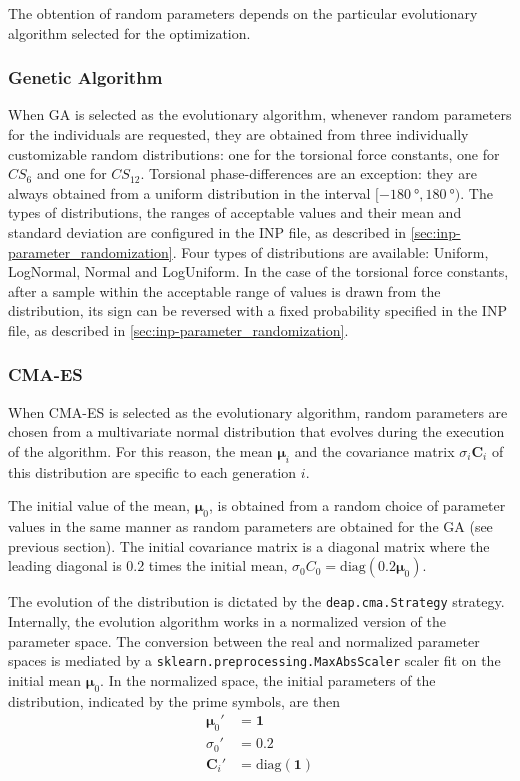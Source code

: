 \documentclass[10pt,a4paper,openany]{memoir}
\numberwithin{equation}{section}
\begin{document}
The obtention of random parameters depends on the particular
evolutionary algorithm selected for the optimization.

\subsubsection{Genetic Algorithm}

When GA is selected as the evolutionary algorithm, whenever random
parameters for the individuals are requested, they are obtained from
three individually customizable random distributions: one for the
torsional force constants, one for $CS_6$ and one for $CS_{12}$.
Torsional phase-differences are an exception: they are always obtained
from a uniform distribution in the interval $[\SI{-180}{\degree},
\SI{180}{\degree})$.  The types of distributions, the ranges of
acceptable values and their mean and standard deviation are configured
in the INP file, as described in
\autoref{sec:inp-parameter_randomization}.  Four types of
distributions are available: Uniform, LogNormal, Normal and
LogUniform. In the case of the torsional force constants, after a
sample within the acceptable range of values is drawn from the
distribution, its sign can be reversed with a fixed probability
specified in the INP file, as described in
\autoref{sec:inp-parameter_randomization}.

\subsubsection{CMA-ES}

When CMA-ES is selected as the evolutionary algorithm, random
parameters are chosen from a multivariate normal distribution that
evolves during the execution of the algorithm. For this reason, the
mean $\boldsymbol{\mu}_i$ and the covariance matrix
$\sigma_i \boldsymbol{C}_i$ of this distribution are specific to each
generation $i$.

The initial value of the mean, $\boldsymbol{\mu}_0$,
is obtained from a random choice of parameter values in the same
manner as random parameters are obtained for the GA (see previous
section). The initial covariance matrix is a diagonal matrix where the
leading diagonal is 0.2 times the initial mean,
$\sigma_0 C_0 = \text{diag} (0.2\boldsymbol{\mu}_0)$.

The evolution of the distribution is dictated by the
\texttt{deap.cma.Strategy} strategy.  Internally, the evolution
algorithm works in a normalized version of the parameter space. The
conversion between the real and normalized parameter spaces is
mediated by a \texttt{sklearn.preprocessing.MaxAbsScaler} scaler fit
on the initial mean $\boldsymbol{\mu}_0$. In the normalized space, the
initial parameters of the distribution, indicated by the prime
symbols, are then
\begin{align*}
  \boldsymbol{\mu}_0' & = \mathbf{1} \\
  \sigma_0' & = 0.2 \\
  \boldsymbol{C}_i' & = \text{diag} (\mathbf{1}) 
\end{align*}
\end{document}
